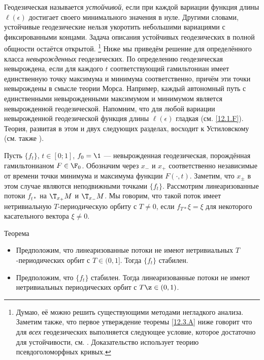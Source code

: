 Геодезическая называется \emph{устойчивой}, если при каждой вариации функция длины $\ell(\epsilon)$ достигает своего минимального значения в нуле.
Другими словами, устойчивые геодезические нельзя укоротить небольшими вариациями с фиксированными концами.
Задача описания устойчивых геодезических в полной общности остаётся открытой.%
\footnote{Думаю, её можно решить существующими методами негладкого анализа.
Заметим также, что первое утверждение теоремы \ref{12.3.A} ниже говорит что для {}\emph{всех} геодезических выполняется следующее условие, которое достаточно для устойчивости, см. \cite{LM3}.
Доказательство использует теорию псевдоголоморфных кривых.}
Ниже мы приведём решение для определённого класса \emph{невырожденных} геодезических.
По определению геодезическая невырождена, если для каждого $t$ соответствующий гамильтониан имеет единственную точку максимума и минимума соответственно, причём эти точки невырождены в смысле теории Морса.
Например, каждый автономный путь с единственными невырожденными максимумом и минимумом является невырожденной геодезической.
Напомним, что для любой вариации невырожденной геодезической функция длины $\ell(\epsilon)$ гладкая (см. \ref{12.1.F}).
Теория, развитая в этом и двух следующих разделах, восходит к Устиловскому \cite{U} (см. также \cite{LM2}).

Пусть $\{f_t\}$, $t \in [0; 1]$, $f_0 = \1$ --- невырожденная геодезическая, порождённая гамильтонианом $F\in \F_0$.
Обозначим через $x_-$ и $x_+$ соответственно независимые от времени точки минимума и максимума функции $F(\cdot, t)$.
Заметим, что $x_\pm$ в этом случае являются неподвижными точками $\{f_t\}$.
Рассмотрим линеаризованные потоки $f_{t*}$ на $\T_{x_+}M$ и $\T_{x_-}M$.
Мы говорим, что такой поток имеет нетривиальную $T$-периодическую орбиту с $T\ne0$, если $f_{T*}\xi=\xi$ для некоторого касательного вектора $\xi\ne0$.

\begin{thm}{Теорема}\label{12.3.A}

\begin{itemize}
\item Предположим, что линеаризованные потоки не имеют нетривиальных $T$-периодических орбит с $T\in(0,1]$.
Тогда $\{f_t\}$ стабилен.
\item Предположим, что $\{f_t\}$ стабилен.
Тогда линеаризованные потоки не имеют нетривиальных периодических орбит с $T\z\in(0,1)$.
\end{itemize}
\end{thm}

